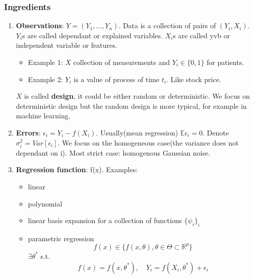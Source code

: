 \documentclass[a4paper,12pt, oneside, fleqn]{book}
\theoremstyle{definition}
\theoremstyle{remark}
\begin{document}
\subsubsection*{Ingredients}
\begin{enumerate}
	\item \textbf{Observations}: $Y = (Y_1, \dots, Y_n)$. Data is a collection of pairs of $(Y_i, X_i)$. $Y_i$s are called dependant or explained variables. $X_i$s are called yvb or independent variable or features. 
		\begin{itemize}
			\item Example 1: $X$ collection of measurements and $Y_i \in \{0, 1\}$ for patients. 
			\item Example 2: $Y_i$ is a value of process of time $t_i$. Like stock price.
		\end{itemize}  $X$ is called \textbf{design}, it could be either random or deterministic. We focus on deterministic design but the random design is more typical, for example in machine learning. 
	\item \textbf{Errors}: $\epsilon_i = Y_i - f(X_i)$. Usually(mean regression) $\mathbb{E} \epsilon_i = 0$. Denote $\sigma_i^2 = Var[\epsilon_i]$. We focus on the homogeneous case(the variance does not dependant on i). Most strict case: homogenous Gaussian noise.
	\item \textbf{Regression function}: f(x). Examples: 
		\begin{itemize}
			\item linear
			\item polynomial
			\item linear basis expansion for a collection of functions $\{\psi_i \}_i$
			\item parametric regression
				\begin{equation*}
					f(x) \in \{ f(x, \theta), \theta \in \Theta \subset \mathbb{R}^p \}
				\end{equation*}
				$\exists \theta^*$ s.t.
				\begin{equation}
					f(x) = f(x, \theta^*), \quad Y_i = f(X_i, \theta^*) + \epsilon_i
				\end{equation} 
			\end{itemize}
\end{enumerate}
\end{document}
